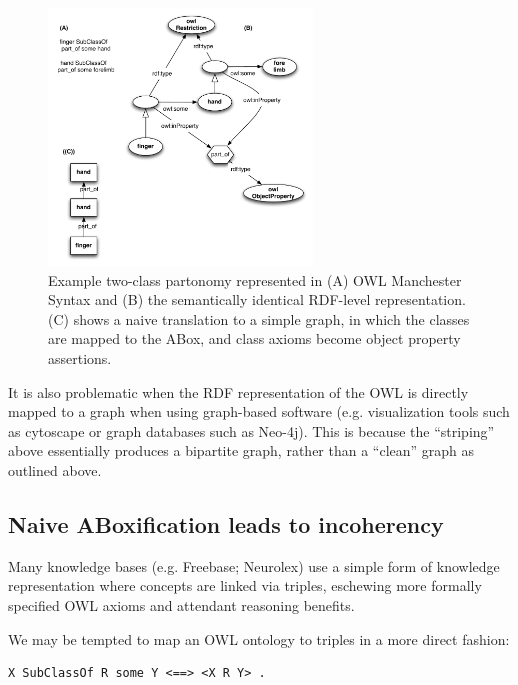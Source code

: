 \documentclass{my}
\begin{document}
\begin{figure}
\center
\includegraphics[width=7cm]{partonomy}
\caption{Example two-class partonomy represented in (A) OWL Manchester
  Syntax and (B) the semantically identical RDF-level
  representation. (C) shows a naive translation to a simple graph, in
  which the classes are mapped to the ABox, and class axioms become
  object property assertions.}
\label{fig:partonomy}
\end{figure}


It is also problematic when the RDF representation of the OWL is
directly mapped to a graph when using graph-based software
(e.g. visualization tools such as cytoscape or graph databases such as
Neo-4j). This is because the ``striping'' above essentially produces a
bipartite graph, rather than a ``clean'' graph as outlined above.


\subsection{Naive ABoxification leads to incoherency}

Many knowledge bases (e.g. Freebase; Neurolex) use a simple form of
knowledge representation where concepts are linked via triples,
eschewing more formally specified OWL axioms and attendant reasoning
benefits.

We may be tempted to map an OWL ontology to triples in a more direct
fashion:

\begin{verbatim}
X SubClassOf R some Y <==> <X R Y> .
\end{verbatim}
\end{document}
